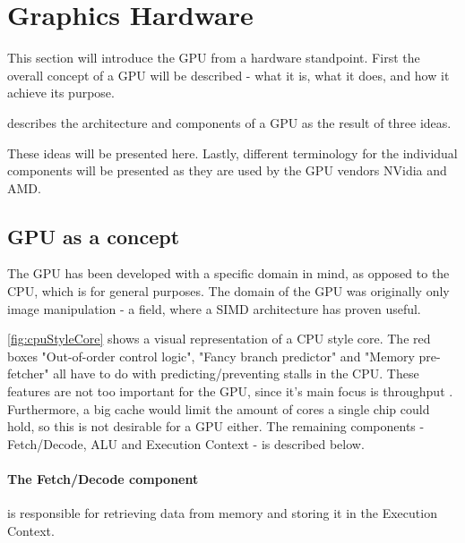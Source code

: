 \section{Graphics Hardware}\label{sec:graphics_hardware}


\begin{sectionmeta}
	
	This section will introduce the \gls{GPU} from a hardware standpoint. 
	First the overall concept of a \gls{GPU} will be described - what it is, what it does, and how it achieve its purpose.
	
	\cite{intro_to_gpu_arch} describes the architecture and components of a \gls{GPU} as the result of three ideas.
	
	These ideas will be presented here.
	Lastly, different terminology for the individual components will be presented as they are used by the \gls{GPU} vendors NVidia and AMD.  
	
\end{sectionmeta}


\subsection{GPU as a concept}
The \gls{GPU} has been developed with a specific domain in mind, as opposed to the CPU, which is for general purposes. 
The domain of the \gls{GPU} was originally only image manipulation - a field, where a \gls{SIMD} architecture has proven useful.


\ref{fig:cpuStyleCore} shows a visual representation of a \gls{CPU} style core. 
The red boxes "Out-of-order control logic", "Fancy branch predictor" and "Memory pre-fetcher" all have to do with predicting/preventing stalls in the \gls{CPU}.
These features are not too important for the \gls{GPU}, since it's main focus is throughput . 
Furthermore, a big cache would limit the amount of cores a single chip could hold, so this is not desirable for a \gls{GPU} either.
The remaining components - Fetch/Decode, ALU and Execution Context - is described below.

\paragraph{The Fetch/Decode component} is responsible for retrieving data from memory and storing it in the Execution Context.

